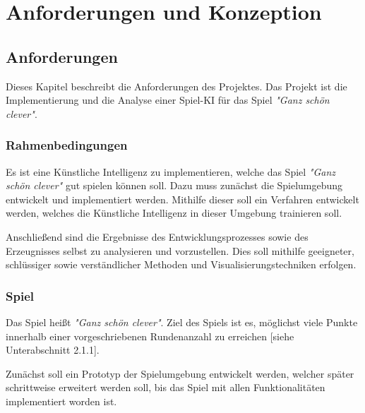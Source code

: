 \section{Anforderungen und Konzeption}
\subsection{Anforderungen}
Dieses Kapitel beschreibt die Anforderungen des Projektes. Das Projekt ist die Implementierung und die Analyse einer Spiel-KI für das Spiel \textit{"Ganz schön clever"}.
\subsubsection{Rahmenbedingungen}
Es ist eine Künstliche Intelligenz zu implementieren, welche das Spiel \textit{"Ganz schön clever"} gut spielen können soll. Dazu muss zunächst die Spielumgebung entwickelt und implementiert werden. Mithilfe dieser soll ein Verfahren entwickelt werden, welches die Künstliche Intelligenz in dieser Umgebung trainieren soll.

Anschließend sind die Ergebnisse des Entwicklungsprozesses sowie des Erzeugnisses selbst zu analysieren und vorzustellen. Dies soll mithilfe geeigneter, schlüssiger sowie verständlicher Methoden und Visualisierungstechniken erfolgen.
\subsubsection{Spiel}
Das Spiel heißt \textit{"Ganz schön clever"}. Ziel des Spiels ist es, möglichst viele Punkte innerhalb einer vorgeschriebenen Rundenanzahl zu erreichen [siehe Unterabschnitt 2.1.1].

Zunächst soll ein Prototyp der Spielumgebung entwickelt werden, welcher später schrittweise erweitert werden soll, bis das Spiel mit allen Funktionalitäten implementiert worden ist.\\


